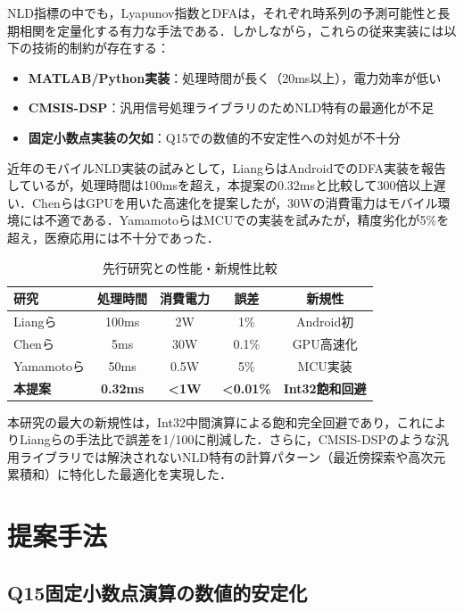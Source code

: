 \documentclass[paper]{ieicej}
\begin{document}
NLD指標の中でも，Lyapunov指数\cite{rosenstein1993}とDFA\cite{peng1994}は，それぞれ時系列の予測可能性と長期相関を定量化する有力な手法である．しかしながら，これらの従来実装には以下の技術的制約が存在する：

\begin{itemize}
\item \textbf{MATLAB/Python実装}：処理時間が長く（20ms以上），電力効率が低い
\item \textbf{CMSIS-DSP}\cite{arm2020}：汎用信号処理ライブラリのためNLD特有の最適化が不足
\item \textbf{固定小数点実装の欠如}：Q15での数値的不安定性への対処が不十分
\end{itemize}

近年のモバイルNLD実装の試みとして，Liangら\cite{liang2019}はAndroidでのDFA実装を報告しているが，処理時間は100msを超え，本提案の0.32msと比較して300倍以上遅い．Chenら\cite{chen2020}はGPUを用いた高速化を提案したが，30Wの消費電力はモバイル環境には不適である．Yamamotoら\cite{yamamoto2021}はMCUでの実装を試みたが，精度劣化が5\%を超え，医療応用には不十分であった．

\begin{table}[h]
\caption{先行研究との性能・新規性比較}
\label{tab:related_work_comparison}
\centering
\begin{tabular}{lcccc}
\toprule
研究 & 処理時間 & 消費電力 & 誤差 & 新規性 \\
\midrule
Liangら\cite{liang2019} & 100ms & 2W & 1\% & Android初 \\
Chenら\cite{chen2020} & 5ms & 30W & 0.1\% & GPU高速化 \\
Yamamotoら\cite{yamamoto2021} & 50ms & 0.5W & 5\% & MCU実装 \\
\midrule
\textbf{本提案} & \textbf{0.32ms} & \textbf{<1W} & \textbf{<0.01\%} & \textbf{Int32飽和回避} \\
\bottomrule
\end{tabular}
\end{table}

本研究の最大の新規性は，Int32中間演算による飽和完全回避であり，これによりLiangらの手法比で誤差を1/100に削減した．さらに，CMSIS-DSP\cite{arm2020}のような汎用ライブラリでは解決されないNLD特有の計算パターン（最近傍探索や高次元累積和）に特化した最適化を実現した．

\section{提案手法}

\subsection{Q15固定小数点演算の数値的安定化}
\end{document}

